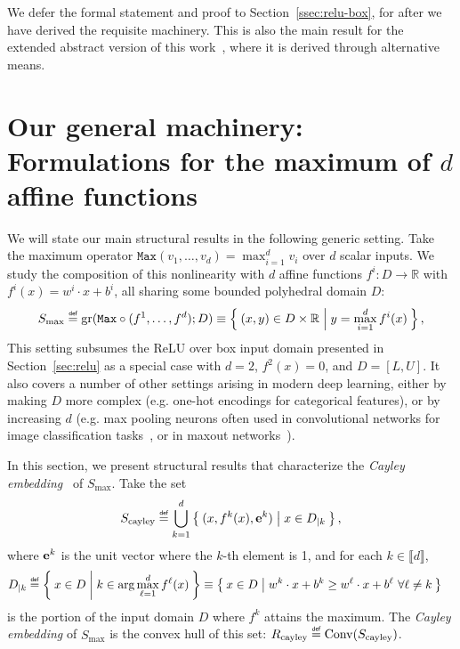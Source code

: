 \documentclass[smallextended]{svjour3}
\newcommand{\bbR}{\mathbb{R}}
\newcommand{\Conv}{\operatorname{Conv}}
\newcommand{\gr}{\operatorname{gr}}
\newcommand\defeq{\mathrel{\overset{\makebox[0pt]{\mbox{\normalfont\tiny\sffamily def}}}{=}}}
\newcommand{\Max}{\texttt{Max}}
\newcommand{\Rcayley}{R_{\operatorname{cayley}}}
\newcommand{\Smax}{S_{\operatorname{max}}}
\newcommand{\Scayley}{S_{\operatorname{cayley}}}
\begin{document}
We defer the formal statement and proof to Section~\ref{ssec:relu-box}, for after we have derived the requisite machinery. This is also the main result for the extended abstract version of this work~\cite{Anderson:2019}, where it is derived through alternative means.

\section{Our general machinery: Formulations for the maximum of $d$ affine functions} \label{sec:max}

We will state our main structural results in the following generic setting. Take the maximum operator $\Max{}(v_1,\ldots,v_d) = \max_{i=1}^d v_i$ over $d$ scalar inputs. We study the composition of this nonlinearity with $d$ affine functions $f^i : D \to \bbR$ with $f^i(x) = w^i \cdot x + b^i$, all sharing some bounded polyhedral domain $D$:
\[
    \Smax \defeq \gr(\Max{} \circ (f^1,\ldots,f^d); D) \equiv \Set{ (x,y) \in D \times \bbR | y = \max_{i=1}^d f^i(x) },
\]
This setting subsumes the ReLU over box input domain presented in Section~\ref{sec:relu} as a special case with $d=2$, $f^2(x) = 0$, and $D = [L,U]$. It also covers a number of other settings arising in modern deep learning, either by making $D$ more complex (e.g. one-hot encodings for categorical features), or by increasing $d$ (e.g. max pooling neurons often used in convolutional networks for image classification tasks~\cite{Boureau:2010}, or in maxout networks~\cite{Goodfellow:2013}).

In this section, we present structural results that characterize the \emph{Cayley embedding}~\cite{Huber:2000,Vielma:2016,Vielma:2018,Weibel:2007} of $\Smax$. Take the set
\[
    \Scayley \defeq \bigcup_{k=1}^d \Set{ (x,f^k(x),{\bf e}^k) | x \in D_{|k}},
\]
where ${\bf e}^k$ is the unit vector where the $k$-th element is 1, and for each $k \in \llbracket d \rrbracket$,
\begin{align*}
D_{|k} &\defeq \Set{ x \in D | k \in \arg\max_{\ell=1}^d f^\ell(x)} \equiv \Set{x \in D | w^k \cdot x + b^k \geq w^\ell \cdot x + b^\ell \ \forall \ell \neq k }
\end{align*}
is the portion of the input domain $D$ where $f^k$ attains the maximum. The \emph{Cayley embedding} of $\Smax$ is the convex hull of this set: $\Rcayley \defeq \Conv(\Scayley)$.
\end{document}
